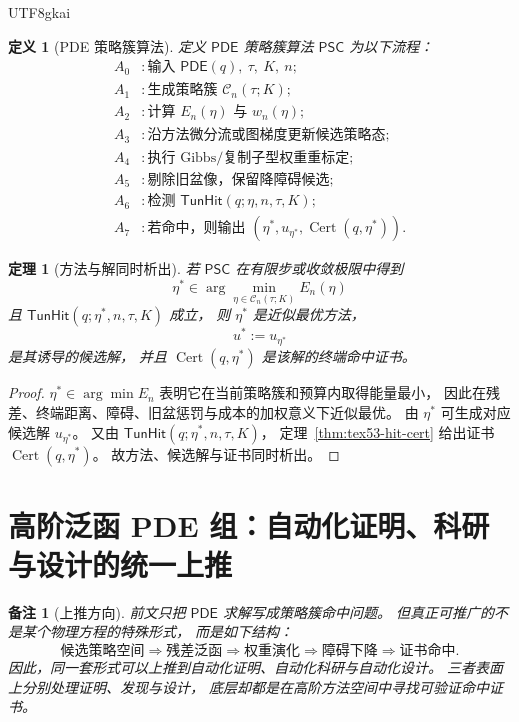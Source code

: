 \documentclass[12pt]{article}
\newtheorem{definition}{定义}[section]
\newtheorem{theorem}{定理}[section]
\newtheorem{remark}{备注}[section]
\newcommand{\PDE}{\mathsf{PDE}}
\newcommand{\TunHit}{\mathsf{TunHit}}
\newcommand{\Cert}{\operatorname{Cert}}
\begin{document}
\begin{CJK*}{UTF8}{gkai}
\begin{definition}[PDE 策略簇算法]
定义 \(\PDE\) 策略簇算法 \(\mathsf{PSC}\) 为以下流程：
\[
\begin{aligned}
  A_0 &: \text{输入 }\PDE(q),\ \tau,\ K,\ n;\\
  A_1 &: \text{生成策略簇 }\mathcal C_n(\tau;K);\\
  A_2 &: \text{计算 }E_n(\eta)\text{ 与 }w_n(\eta);\\
  A_3 &: \text{沿方法微分流或图梯度更新候选策略态};\\
  A_4 &: \text{执行 Gibbs/复制子型权重重标定};\\
  A_5 &: \text{剔除旧盆像，保留降障碍候选};\\
  A_6 &: \text{检测 }\TunHit(q;\eta,n,\tau,K);\\
  A_7 &: \text{若命中，则输出 }(\eta^\ast,u_{\eta^\ast},\Cert(q,\eta^\ast)).
\end{aligned}
\]
\end{definition}

\begin{theorem}[方法与解同时析出]
\label{thm:tex53-method-solution}
若 \(\mathsf{PSC}\) 在有限步或收敛极限中得到
\[
  \eta^\ast\in\arg\min_{\eta\in\mathcal C_n(\tau;K)}E_n(\eta)
\]
且 \(\TunHit(q;\eta^\ast,n,\tau,K)\) 成立，
则 \(\eta^\ast\) 是近似最优方法，
\[
  u^\ast:=u_{\eta^\ast}
\]
是其诱导的候选解，
并且 \(\Cert(q,\eta^\ast)\) 是该解的终端命中证书。
\end{theorem}

\begin{proof}
\(\eta^\ast\in\arg\min E_n\) 表明它在当前策略簇和预算内取得能量最小，
因此在残差、终端距离、障碍、旧盆惩罚与成本的加权意义下近似最优。
由 \(\eta^\ast\) 可生成对应候选解 \(u_{\eta^\ast}\)。
又由 \(\TunHit(q;\eta^\ast,n,\tau,K)\)，
定理~\ref{thm:tex53-hit-cert} 给出证书 \(\Cert(q,\eta^\ast)\)。
故方法、候选解与证书同时析出。
\end{proof}

\section{高阶泛函 PDE 组：自动化证明、科研与设计的统一上推}
\label{sec:tex53-higher-functional}

\begin{remark}[上推方向]
前文只把 \(\PDE\) 求解写成策略簇命中问题。
但真正可推广的不是某个物理方程的特殊形式，
而是如下结构：
\[
  \text{候选策略空间}
  \Longrightarrow
  \text{残差泛函}
  \Longrightarrow
  \text{权重演化}
  \Longrightarrow
  \text{障碍下降}
  \Longrightarrow
  \text{证书命中}.
\]
因此，同一套形式可以上推到自动化证明、自动化科研与自动化设计。
三者表面上分别处理证明、发现与设计，
底层却都是在高阶方法空间中寻找可验证命中证书。
\end{remark}


\end{CJK*}
\end{document}

